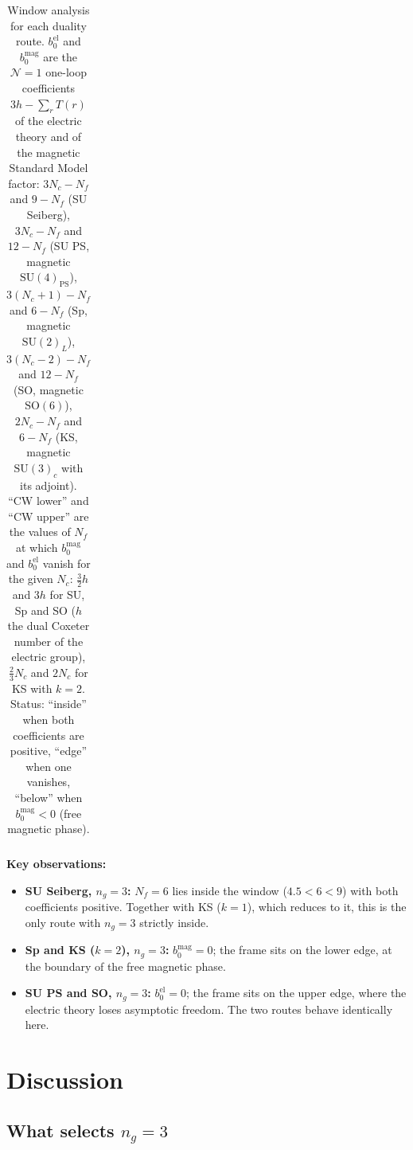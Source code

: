 \documentclass[11pt,a4paper]{article}
\theoremstyle{plain}
\theoremstyle{definition}
\theoremstyle{remark}
\newcommand{\Nc}{N_{\!c}}
\newcommand{\Nf}{N_{\!f}}
\newcommand{\ngen}{n_g}
\newcommand{\SU}[1]{\mathrm{SU}(#1)}
\newcommand{\SO}[1]{\mathrm{SO}(#1)}
\begin{document}
\begin{table}[h!]
\begin{tabular}{@{}l c c c c c c c l@{}}
\end{tabular}
\caption{Window analysis for each duality route.  $b_0^{\text{el}}$ and
$b_0^{\text{mag}}$ are the $\mathcal{N}=1$ one-loop coefficients
$3h - \sum_r T(r)$ of the electric theory and of the magnetic Standard
Model factor: $3\Nc - \Nf$ and $9 - \Nf$ (SU Seiberg), $3\Nc - \Nf$ and
$12 - \Nf$ (SU PS, magnetic $\SU{4}_{\mathrm{PS}}$), $3(\Nc + 1) - \Nf$
and $6 - \Nf$ (Sp, magnetic $\SU{2}_L$), $3(\Nc - 2) - \Nf$ and
$12 - \Nf$ (SO, magnetic $\SO{6}$), $2\Nc - \Nf$ and $6 - \Nf$ (KS,
magnetic $\SU{3}_c$ with its adjoint).  ``CW lower'' and ``CW upper'' are
the values of $\Nf$ at which $b_0^{\text{mag}}$ and $b_0^{\text{el}}$
vanish for the given $\Nc$: $\frac{3}{2}h$ and $3h$ for SU, Sp and SO
($h$ the dual Coxeter number of the electric group), $\frac{2}{3}\Nc$
and $2\Nc$ for KS with $k = 2$.  Status: ``inside'' when both
coefficients are positive, ``edge'' when one vanishes, ``below'' when
$b_0^{\text{mag}} < 0$ (free magnetic phase).}
\label{tab:conformal}
\end{table}

\textbf{Key observations:}
\begin{itemize}
  \item \textbf{SU Seiberg, $\ngen = 3$:} $\Nf = 6$ lies inside the
    window ($4.5 < 6 < 9$) with both coefficients positive.  Together
    with KS ($k = 1$), which reduces to it, this is the only route with
    $\ngen = 3$ strictly inside.
  \item \textbf{Sp and KS ($k = 2$), $\ngen = 3$:}
    $b_0^{\text{mag}} = 0$; the frame sits on the lower edge, at the
    boundary of the free magnetic phase.
  \item \textbf{SU PS and SO, $\ngen = 3$:} $b_0^{\text{el}} = 0$; the
    frame sits on the upper edge, where the electric theory loses
    asymptotic freedom.  The two routes behave identically here.
\end{itemize}


\section{Discussion}
\label{sec:discussion}

\subsection{What selects $\ngen = 3$}
\end{document}
